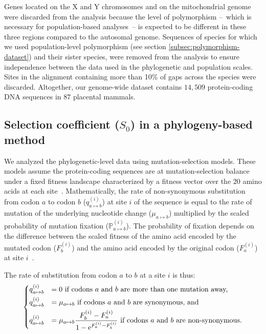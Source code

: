 \documentclass[12pt]{article}
\newcommand{\e}{\text{e}}
\newcommand{\proba}{\mathbb{P}}
\newcommand{\Sphy}{S_{0}}
\begin{document}
    Genes located on the X and Y chromosomes and on the mitochondrial genome were discarded from the analysis because the level of polymorphism –~which is necessary for population-based analyses~– is expected to be different in these three regions compared to the autosomal genome.
    Sequences of species for which we used population-level polymorphism (see section \ref{subsec:polymorphism-dataset}) and their sister species, were removed from the analysis to ensure independence between the data used in the phylogenetic and population scales.
    Sites in the alignment containing more than 10\% of gaps across the species were discarded.
    Altogether, our genome-wide dataset contains $14,509$ protein-coding DNA sequences in $87$ placental mammals.

    \subsection{Selection coefficient ($\Sphy$) in a phylogeny-based method}
    \label{subsec:s-phylogeny-method}

    We analyzed the phylogenetic-level data using mutation-selection models.
    These models assume the protein-coding sequences are at mutation-selection balance under a fixed fitness landscape characterized by a fitness vector over the $20$ amino acids at each site~\cite{yang_mutationselection_2008, halpern_evolutionary_1998, rodrigue_mechanistic_2010}.
    Mathematically, the rate of non-synonymous substitution from codon $a$ to codon $b$ ($q_{a \mapsto b}^{(i)}$) at site $i$ of the sequence is equal to the rate of mutation of the underlying nucleotide change ($\mu_{a \mapsto b}$) multiplied by the scaled probability of mutation fixation ($\proba_{a \mapsto b}^{(i)}$).
    The probability of fixation depends on the difference between the scaled fitness of the amino acid encoded by the mutated codon ($F_b^{(i)}$) and the amino acid encoded by the original codon ($F_a^{(i)}$) at site $i$~\cite{wright_evolution_1931, fisher_genetical_1930}.

    The rate of substitution from codon $a$ to $b$ at a site $i$ is thus:
    \begin{equation}
        \begin{dcases}
            q_{a \mapsto b}^{(i)} & = 0 \text{ if codons $a$ and $b$ are more than one mutation away,} \\
            q_{a \mapsto b}^{(i)} & = \mu_{a \mapsto b} \text{ if codons $a$ and $b$ are synonymous, and}\\
            q_{a \mapsto b}^{(i)} & = \mu_{a \mapsto b} \dfrac{F_b^{(i)} - F_a^{(i)}}{1 - \e^{F_a^{(i)} - F_b^{(i)}}} \text{ if codons $a$ and $b$ are non-synonymous}.
        \end{dcases}
    \end{equation}
\end{document}

